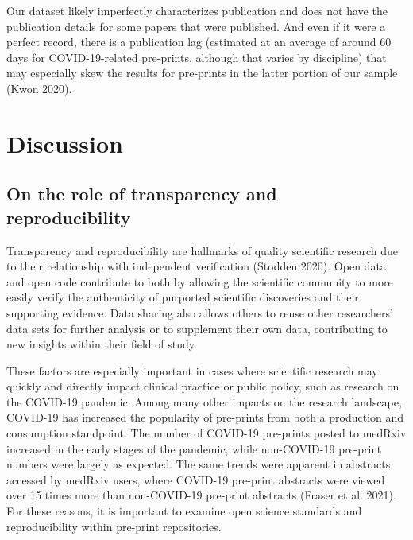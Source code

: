 \documentclass[
]{article}
\begin{document}
Our dataset likely imperfectly characterizes publication and does not have the publication details for some papers that were published. And even if it were a perfect record, there is a publication lag (estimated at an average of around 60 days for COVID-19-related pre-prints, although that varies by discipline) that may especially skew the results for pre-prints in the latter portion of our sample (Kwon 2020).

\hypertarget{discussion}{%
\section{Discussion}\label{discussion}}

\hypertarget{on-the-role-of-transparency-and-reproducibility}{%
\subsection{On the role of transparency and reproducibility}\label{on-the-role-of-transparency-and-reproducibility}}

Transparency and reproducibility are hallmarks of quality scientific research due to their relationship with independent verification (Stodden 2020). Open data and open code contribute to both by allowing the scientific community to more easily verify the authenticity of purported scientific discoveries and their supporting evidence. Data sharing also allows others to reuse other researchers' data sets for further analysis or to supplement their own data, contributing to new insights within their field of study.

These factors are especially important in cases where scientific research may quickly and directly impact clinical practice or public policy, such as research on the COVID-19 pandemic. Among many other impacts on the research landscape, COVID-19 has increased the popularity of pre-prints from both a production and consumption standpoint. The number of COVID-19 pre-prints posted to medRxiv increased in the early stages of the pandemic, while non-COVID-19 pre-print numbers were largely as expected. The same trends were apparent in abstracts accessed by medRxiv users, where COVID-19 pre-print abstracts were viewed over 15 times more than non-COVID-19 pre-print abstracts (Fraser et al. 2021). For these reasons, it is important to examine open science standards and reproducibility within pre-print repositories.
\end{document}
